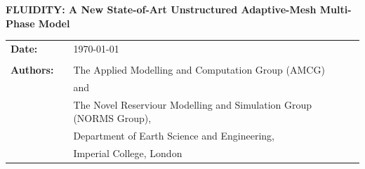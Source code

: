 \documentclass[11pts,a4paper,amsmath,amssymb,floatfix]{article}%
\begin{document}
\vspace{4cm}

\begin{titlepage}
\begin{center}

\bigskip



\bigskip
\vspace{3.5cm}

{\bf{\Large FLUIDITY: A New State-of-Art Unstructured Adaptive-Mesh Multi-Phase Model }}
\vspace{3.5cm}
\end{center}

\bigskip

\begin{tabular}{l c l}
{\bf{\large Date:}}                            &     &   \today\\
                                               &     &         \\
{\bf{\large Authors:}}                         &     & The Applied Modelling and Computation Group (AMCG) \\
                                               &     & and \\
                                               &     & The Novel Reserviour Modelling and Simulation Group (NORMS Group), \\
                                               &     & Department of Earth Science and  Engineering, \\
                                               &     & Imperial College, London \\
\end{tabular}



\end{titlepage}

\setcounter{page}{1}

\tableofcontents
\vfill
\pagebreak
\listoftables
\vfill
\pagebreak
\listoffigures
\vfill
\pagebreak




\pagebreak

\pagebreak

\pagebreak

\pagebreak
\end{document}
